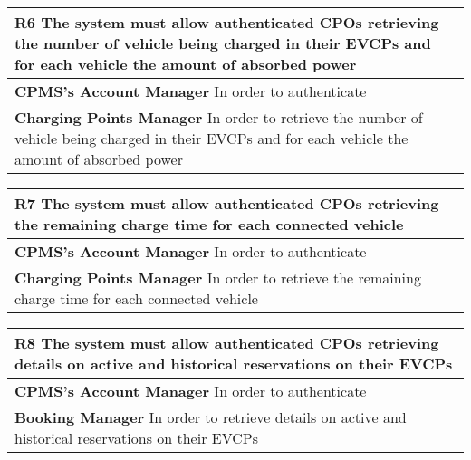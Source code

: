 \begin{table}[H]
    \begin{tabularx}{\textwidth}{X}
        \toprule
        \textbf{R6} The system must allow authenticated CPOs retrieving the number of vehicle
        being charged in their EVCPs and for each vehicle the amount of absorbed
        power                                                                                                                                                      \\ \midrule
        \textbf{CPMS's Account Manager} In order to authenticate                                                                                                   \\
        \textbf{Charging Points Manager} In order to retrieve the number of vehicle being charged in their EVCPs and for each vehicle the amount of absorbed power \\
    \end{tabularx}
\end{table}
\begin{table}[H]
    \begin{tabularx}{\textwidth}{X}
        \toprule
        \textbf{R7} The system must allow authenticated CPOs retrieving the remaining charge
        time for each connected vehicle                                                                             \\ \midrule
        \textbf{CPMS's Account Manager}  In order to authenticate                                                   \\
        \textbf{Charging Points Manager}  In order to retrieve the remaining charge time for each connected vehicle \\
    \end{tabularx}
\end{table}
\begin{table}[H]
    \begin{tabularx}{\textwidth}{X}
        \toprule
        \textbf{R8} The system must allow authenticated CPOs retrieving details on active and
        historical reservations on their EVCPs                                                                      \\ \midrule
        \textbf{CPMS's Account Manager}  In order to authenticate                                                   \\
        \textbf{Booking Manager}  In order to retrieve details on active and historical reservations on their EVCPs \\
    \end{tabularx}
\end{table}
